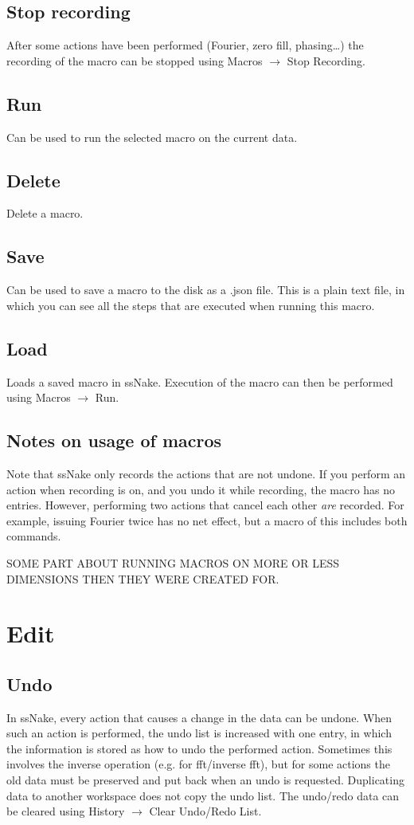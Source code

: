 \documentclass[11pt,a4paper]{article}
\begin{document}
\subsection{Stop recording}
After some actions have been performed (Fourier, zero fill, phasing\ldots   ) the recording of the macro can be stopped using Macros $\rightarrow$ Stop Recording. 

\subsection{Run}
Can be used to run the selected macro on the current data.

\subsection{Delete}
Delete a macro.

\subsection{Save}
Can be used to save a macro to the disk as a .json file. This is a plain text file, in which you can see all the steps that are executed when running this macro.

\subsection{Load}
Loads a saved macro in ssNake. Execution of the macro can then be performed using Macros $\rightarrow$ Run.

\subsection{Notes on usage of macros}
Note that ssNake only records the actions that are not undone. If you perform an action when recording is on, and you undo it while recording, the macro has no entries. However, performing two actions that cancel each other \textit{are} recorded. For example, issuing Fourier twice has no net effect, but a macro of this includes both commands.

SOME PART ABOUT RUNNING MACROS ON MORE OR LESS DIMENSIONS THEN THEY WERE CREATED FOR.




\section{Edit}
\subsection{Undo}
In ssNake, every action that causes a change in the data can be undone. When such an action is performed, the undo list is increased with one entry, in which the information is stored as how to undo the performed action. Sometimes this involves the inverse operation (e.g. for fft/inverse fft), but for some actions the old data must be preserved and put back when an undo is requested. Duplicating data to another workspace does not copy the undo list. The undo/redo data can be cleared using History $\rightarrow$ Clear Undo/Redo List.
\end{document}
